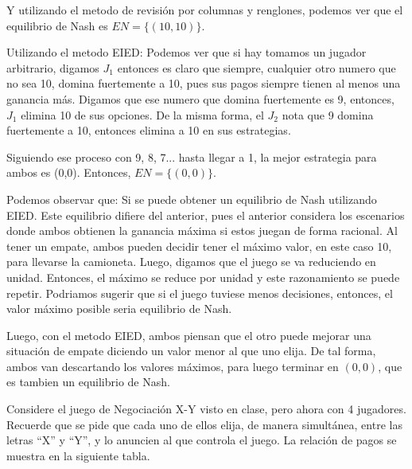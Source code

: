 \documentclass{homework}
\begin{document}
Y utilizando el metodo de revisión por columnas y renglones, podemos ver que el equilibrio de Nash es $EN = \{ (10,10) \} $.

Utilizando el metodo EIED: Podemos ver que si hay tomamos un jugador arbitrario, digamos $J_1$ entonces es claro que siempre, cualquier otro numero que no sea 10, domina fuertemente a 10, pues sus pagos siempre tienen al menos una ganancia más. Digamos que ese numero que domina fuertemente es 9, entonces, $J_1$ elimina 10 de sus opciones. De la misma forma, el $J_2$ nota que 9 domina fuertemente a 10, entonces elimina a 10 en sus estrategias.

Siguiendo ese proceso con 9, 8, 7... hasta llegar a 1, la mejor estrategia para ambos es (0,0). Entonces, $EN = \{ (0,0) \} $.

Podemos observar que:  Si se puede obtener un equilibrio de Nash utilizando EIED. Este equilibrio difiere del anterior, pues el anterior considera los escenarios donde ambos obtienen la ganancia máxima si estos juegan de forma racional. Al tener un empate, ambos pueden decidir tener el máximo valor, en este caso 10, para llevarse la camioneta. Luego, digamos que el juego se va reduciendo en unidad. Entonces, el máximo se reduce por unidad y este razonamiento se puede repetir. Podriamos sugerir que si el juego tuviese menos decisiones, entonces, el valor máximo posible seria equilibrio de Nash.

Luego, con el metodo EIED, ambos piensan que el otro puede mejorar una situación de empate diciendo un valor menor al que uno elija. De tal forma, ambos van descartando los valores máximos, para luego terminar en $(0,0)$, que es tambien un equilibrio de Nash.


\question  Considere el juego de Negociación X-Y visto en clase, pero ahora con 4 jugadores. Recuerde que se pide que cada uno de ellos elija, de manera simultánea, entre las letras “X” y “Y”, y lo anuncien al que controla el juego. La relación de pagos se muestra en la siguiente tabla.
\end{document}
